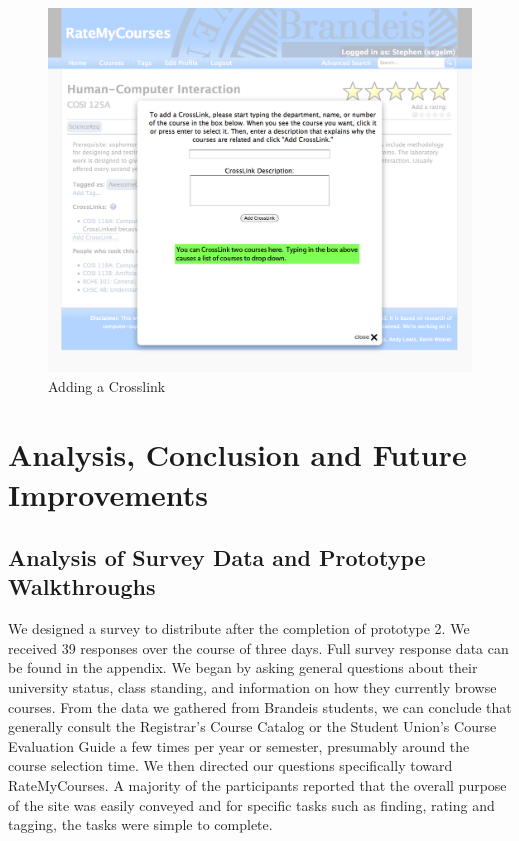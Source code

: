 \documentclass[12pt]{report}
\begin{document}
\begin{figure}
\includegraphics[width=\textwidth]{narrative-5.png}
\caption{Adding a Crosslink}
\label{fig:crosslink}
\end{figure}


\chapter{Analysis, Conclusion and Future Improvements}

\section{Analysis of Survey Data and Prototype Walkthroughs}

We designed a survey to distribute after the completion of prototype 2. We received 39 responses over the course of three days. Full survey response data can be found in the appendix. We began by asking general questions about their university status, class standing, and information on how they currently browse courses. From the data we gathered from Brandeis students, we can conclude that generally consult the Registrar's Course Catalog or the Student Union's Course Evaluation Guide a few times per year or semester, presumably around the course selection time. We then directed our questions specifically toward RateMyCourses. A majority of the participants reported that the overall purpose of the site was easily conveyed and for specific tasks such as finding, rating and tagging, the tasks were simple to complete.
\end{document}
